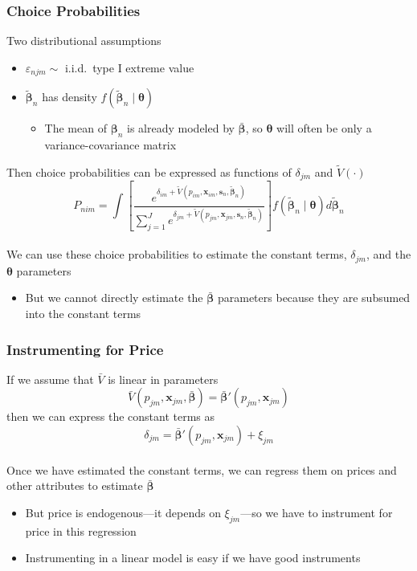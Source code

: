 \documentclass{beamer}
\begin{document}
\begin{frame}\frametitle{Choice Probabilities}
    Two distributional assumptions
    \begin{itemize}
        \item $\varepsilon_{njm} \sim$ i.i.d.\ type I extreme value
        \item $\widetilde{\bm{\beta}}_n$ has density $f(\widetilde{\bm{\beta}}_n \mid \bm{\theta})$
        \begin{itemize}
            \item The mean of $\bm{\beta}_n$ is already modeled by $\bar{\bm{\beta}}$, so $\bm{\theta}$ will often be only a variance-covariance matrix
        \end{itemize}
    \end{itemize}
    \vspace{2ex}
    Then choice probabilities can be expressed as functions of $\delta_{jm}$ and $\widetilde{V}(\cdot)$
    $$P_{nim} = \int \left[ \frac{e^{\delta_{im} + \widetilde{V}(p_{im}, \bm{x}_{im}, \bm{s}_n, \widetilde{\bm{\beta}}_n)}}{\sum_{j = 1}^{J} e^{\delta_{jm} + \widetilde{V}(p_{jm}, \bm{x}_{jm}, \bm{s}_n, \widetilde{\bm{\beta}}_n)}} \right] f(\widetilde{\bm{\beta}}_n \mid \bm{\theta}) d \widetilde{\bm{\beta}}_n$$ \\
    \vspace{2ex}
    We can use these choice probabilities to estimate the constant terms, $\delta_{jm}$, and the $\bm{\theta}$ parameters
    \begin{itemize}
        \item But we cannot directly estimate the $\bar{\bm{\beta}}$ parameters because they are subsumed into the constant terms
    \end{itemize}
\end{frame}

\begin{frame}\frametitle{Instrumenting for Price}
    If we assume that $\bar{V}$ is linear in parameters
    $$\bar{V}(p_{jm}, \bm{x}_{jm}, \bar{\bm{\beta}}) = \bar{\bm{\beta}}' (p_{jm}, \bm{x}_{jm})$$
    then we can express the constant terms as
    $$\delta_{jm} = \bar{\bm{\beta}}' (p_{jm}, \bm{x}_{jm}) + \xi_{jm}$$ \\
    \vspace{3ex}
    Once we have estimated the constant terms, we can regress them on prices and other attributes to estimate $\bar{\bm{\beta}}$
    \begin{itemize}
        \item But price is endogenous---it depends on $\xi_{jm}$---so we have to instrument for price in this regression
        \item Instrumenting in a linear model is easy if we have good instruments
    \end{itemize}
\end{frame}
\end{document}
